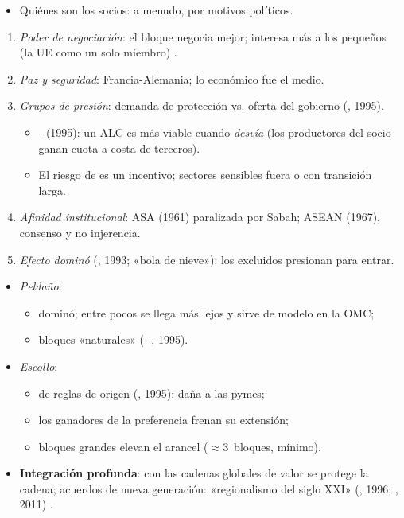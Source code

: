 \documentclass{article}
\begin{document}
\begin{columnas}
\begin{itemize}
\item Quiénes son los socios: a menudo, por motivos políticos.
\end{itemize}
\begin{enumerate}
\item \emph{Poder de negociación}: el bloque negocia mejor; interesa más a los pequeños (la UE como un solo miembro) .
\item \emph{Paz y seguridad}: Francia-Alemania; lo económico fue el medio.
\item \emph{Grupos de presión}: demanda de protección vs. oferta del gobierno (, 1995).
  \begin{itemize}
  \item {}- (1995): un ALC es más viable cuando \emph{desvía} (los productores del socio ganan cuota a costa de terceros).
  \item El riesgo de  es un incentivo; sectores sensibles fuera o con transición larga.
  \end{itemize}
\item \emph{Afinidad institucional}: ASA (1961) paralizada por Sabah; ASEAN (1967), consenso y no injerencia.
\item \emph{Efecto dominó} (, 1993; «bola de nieve»): los excluidos presionan para entrar.
\end{enumerate}
\begin{itemize}
\item \emph{Peldaño}:
  \begin{itemize}
  \item dominó; entre pocos se llega más lejos y sirve de modelo en la OMC;
  \item bloques «naturales» (--, 1995).
  \end{itemize}
\item \emph{Escollo}:
  \begin{itemize}
  \item {} de reglas de origen (, 1995): daña a las pymes;
  \item los ganadores de la preferencia frenan su extensión;
  \item bloques grandes elevan el arancel ($\approx$3~bloques, mínimo).
  \end{itemize}
\item \textbf{Integración profunda}: con las cadenas globales de valor se protege la cadena; acuerdos de nueva generación: «regionalismo del siglo XXI» (, 1996; , 2011) .
\end{itemize}


\end{columnas}
\end{document}
